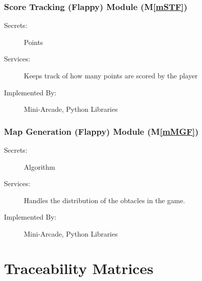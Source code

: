 \documentclass[12pt, titlepage]{article}
\newcommand{\mref}[1]{M\ref{#1}}
\begin{document}
\subsubsection{Score Tracking (Flappy) Module (\mref{mSTF})}
\begin{description}
\item[Secrets:] Points
\item[Services:] Keeps track of how many points are scored by the player 
\item[Implemented By:] Mini-Arcade, Python Libraries
\end{description}

\subsubsection{Map Generation (Flappy) Module (\mref{mMGF})}
\begin{description}
\item[Secrets:] Algorithm
\item[Services:] Handles the distribution of the obtacles in the game.
\item[Implemented By:] Mini-Arcade, Python Libraries
\end{description}

\newpage
\section{Traceability Matrices} \label{SecTM}
\end{document}
